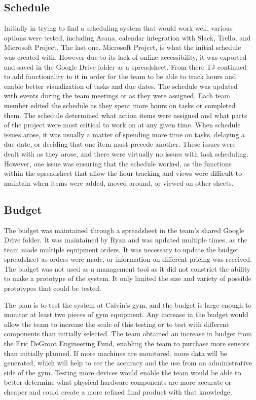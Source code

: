 \documentclass[PPFS.tex]{template/subfiles}
\begin{document}
    \subsection{Schedule}
	Initially in trying to find a scheduling system that would work well, various options were tested, including Asana, calendar integration with Slack, Trello, and Microsoft Project. The last one, Microsoft Project, is what the initial schedule was created with. However due to its lack of online accessibility, it was exported and saved in the Google Drive folder as a spreadsheet. From there TJ continued to add functionality to it in order for the team to be able to track hours and enable better visualization of tasks and due dates. The schedule was updated with events during the team meetings or as they were assigned. Each team member edited the schedule as they spent more hours on tasks or completed them. The schedule determined what action items were assigned and what parts of the project were most critical to work on at any given time. When schedule issues arose, it was usually a matter of spending more time on tasks, delaying a due date, or deciding that one item must precede another. These issues were dealt with as they arose, and there were virtually no issues with task scheduling. However, one issue was ensuring that the schedule worked, as the functions within the spreadsheet that allow the hour tracking and views were difficult to maintain when items were added, moved around, or viewed on other sheets.
	
    \subsection{Budget}
    The budget was maintained through a spreadsheet in the team's shared Google Drive folder. It was maintained by Ryan and was updated multiple times, as the team made multiple equipment orders. It was necessary to update the budget spreadsheet as orders were made, or information on different pricing was received. The budget was not used as a management tool as it did not constrict the ability to make a prototype of the system. It only limited the size and variety of possible prototypes that could be tested.
    
    The plan is to test the system at Calvin's gym, and the budget is large enough to monitor at least two pieces of gym equipment. Any increase in the budget would allow the team to increase the scale of this testing or to test with different components than initially selected. The team obtained an increase in budget from the Eric DeGroot Engineering Fund, enabling the team to purchase more sensors than initially planned. If more machines are monitored, more data will be generated, which will help to see the accuracy and the use from an administrative side of the gym. Testing more devices would enable the team would be able to better determine what physical hardware components are more accurate or cheaper and could create a more refined final product with that knowledge. 
    
\end{document}
